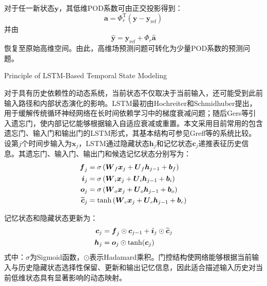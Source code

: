 对于任一新状态$\boldsymbol y$，其低维POD系数可由正交投影得到：
\begin{equation}
	\boldsymbol a
	=
	\boldsymbol\varPhi_r^{\mathrm T}
	\left(
	\boldsymbol y-\boldsymbol y_{\mathrm{ref}}
	\right)
	\label{eq:pod_projection_complete}
\end{equation}
并由
\begin{equation}
	\widehat{\boldsymbol y}
	=
	\boldsymbol y_{\mathrm{ref}}
	+
	\boldsymbol\varPhi_r\widehat{\boldsymbol a}
	\label{eq:pod_reconstruction_complete}
\end{equation}
恢复至原始高维空间。由此，高维场预测问题可转化为少量POD系数的预测问题。

{Principle of LSTM-Based Temporal State Modeling}
\label{subsec:ch6_lstm_theory}

对于具有历史依赖性的动态系统，当前状态不仅取决于当前输入，还可能受到此前输入路径和内部状态演化的影响。LSTM最初由Hochreiter和Schmidhuber提出，用于缓解传统循环神经网络在长时间依赖学习中的梯度衰减问题\cite{hochreiterLongShortTermMemory1997}；随后Gers等引入遗忘门，使内部记忆能够根据输入自适应衰减或重置\cite{gersLearningForgetContinual2000}。本文采用目前常用的包含遗忘门、输入门和输出门的LSTM形式，其基本结构可参见Greff等的系统比较\cite{greffLSTMSearchSpace2017}。设第$j$个时间步输入为$\boldsymbol x_j$，LSTM通过隐藏状态$\boldsymbol h_j$和记忆状态$\boldsymbol c_j$递推表征历史信息。其遗忘门、输入门、输出门和候选记忆状态分别写为：
\begin{align}
	\boldsymbol f_j
	&=\sigma\left(
	\boldsymbol W_f\boldsymbol x_j
	+\boldsymbol U_f\boldsymbol h_{j-1}
	+\boldsymbol b_f\right)
	\notag\\
	\boldsymbol i_j
	&=\sigma\left(
	\boldsymbol W_i\boldsymbol x_j
	+\boldsymbol U_i\boldsymbol h_{j-1}
	+\boldsymbol b_i\right)
	\notag\\
	\boldsymbol o_j
	&=\sigma\left(
	\boldsymbol W_o\boldsymbol x_j
	+\boldsymbol U_o\boldsymbol h_{j-1}
	+\boldsymbol b_o\right)
	\notag\\
	\widetilde{\boldsymbol c}_j
	&=\tanh\left(
	\boldsymbol W_c\boldsymbol x_j
	+\boldsymbol U_c\boldsymbol h_{j-1}
	+\boldsymbol b_c\right)
	\label{eq:lstm_candidate_state}
\end{align}

记忆状态和隐藏状态更新为：
\begin{align}
	\boldsymbol c_j
	&=
	\boldsymbol f_j\odot\boldsymbol c_{j-1}
	+
	\boldsymbol i_j\odot\widetilde{\boldsymbol c}_j
	\notag\\
	\boldsymbol h_j
	&=
	\boldsymbol o_j\odot\tanh(\boldsymbol c_j)
	\label{eq:lstm_hidden_update}
\end{align}
\noindent 式中：$\sigma$为Sigmoid函数，$\odot$表示Hadamard乘积。门控结构使网络能够根据当前输入与历史隐藏状态选择性保留、更新和输出记忆信息，因此适合描述输入历史对当前低维状态具有显著影响的动态映射。

